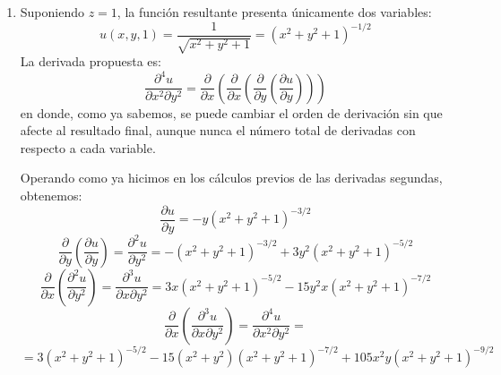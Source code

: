 {\begin{enumerate}
\item Suponiendo $z=1$, la función resultante presenta únicamente
dos variables:
\[
u(x,y,1) = \frac{1}{{\sqrt {x^2  + y^2  + 1} }} = \left( {x^2  + y^2
+ 1} \right)^{ - 1/2}
\]
La derivada propuesta es:
\[
\frac{{\partial ^4 u}}{{\partial x^2 \partial y^2 }} =
\frac{\partial }{{\partial x}}\left( {\frac{\partial }{{\partial
x}}\left( {\frac{\partial }{{\partial y}}\left( {\frac{{\partial
u}}{{\partial y}}} \right)} \right)} \right)
\]
en donde, como ya sabemos, se puede cambiar el orden de derivación
sin que afecte al resultado final, aunque nunca el número total de
derivadas con respecto a cada variable.

Operando como ya hicimos en los cálculos previos de las derivadas
segundas, obtenemos:
\[
\frac{{\partial u}}{{\partial y}} =  - y\left( {x^2  + y^2  + 1}
\right)^{ - 3/2}
\]
\[
\frac{\partial }{{\partial y}}\left( {\frac{{\partial u}}{{\partial
y}}} \right) = \frac{{\partial ^2 u}}{{\partial y^2 }} =  - \left(
{x^2  + y^2  + 1} \right)^{ - 3/2}  + 3y^2 \left( {x^2  + y^2  + 1}
\right)^{ - 5/2}
\]
\[
\frac{\partial }{{\partial x}}\left( {\frac{{\partial ^2
u}}{{\partial y^2 }}} \right) = \frac{{\partial ^3 u}}{{\partial
x\partial y^2 }} = 3x\left( {x^2  + y^2  + 1} \right)^{ - 5/2}  -
15y^2 x\left( {x^2  + y^2  + 1} \right)^{ - 7/2}
\]
\[
\frac{\partial }{{\partial x}}\left( {\frac{{\partial ^3
u}}{{\partial x\partial y^2 }}} \right) = \frac{{\partial ^4
u}}{{\partial x^2 \partial y^2 }} =
\]
\[
=3\left( {x^2  + y^2  + 1} \right)^{ - 5/2}  - 15\left( {x^2  + y^2
} \right)\left( {x^2  + y^2 + 1} \right)^{ - 7/2}  + 105x^2 y\left(
{x^2  + y^2  + 1} \right)^{ - 9/2}
\]
\end{enumerate}
}


